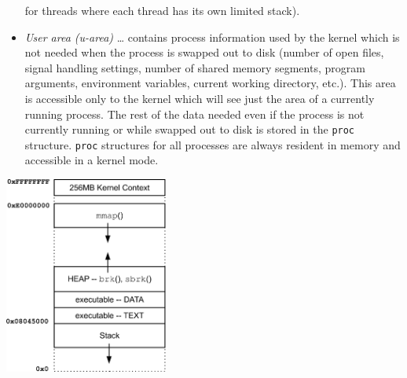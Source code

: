 \begin{itemize}
for threads where each thread has its own limited stack).
\item \emph{User area (u-area)} \dots{} contains process information used by
the kernel which is not needed when the process is swapped out to disk
(number of open files, signal handling settings, number of shared memory segments,
program arguments, environment variables, current working directory, etc.).
This area is accessible only to the kernel which will see just the area 
of a currently running process. The rest of the data needed even if the process
is not currently running or while swapped out to disk is stored in the
\texttt{proc} structure.  \texttt{proc} structures for all processes are always
resident in memory and accessible in a kernel mode.
\end{itemize}

\begin{slide}
\begin{center}
\includegraphics[width=54mm]{img/eps/x86-memory-proc-mem-layout.eps}  
\end{center}
\end{slide}

\label{SOLARIS_PROC_ADDR_SPACE}

